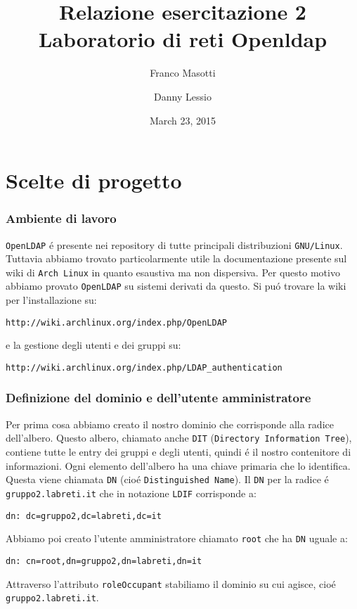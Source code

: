 \documentclass[11pt, a4paper, oneside]{article}
\title{Relazione esercitazione 2 Laboratorio di reti Openldap}
\author{Franco Masotti \and Danny Lessio}
\date{March 23, 2015}
\begin{document}
	\maketitle
	\tableofcontents
	\newpage
	\part{Scelte di progetto}
		\section{Ambiente di lavoro}
			\par
				\texttt{OpenLDAP} \'e presente nei repository 
				di tutte principali distribuzioni 
				\texttt{GNU/Linux}. Tuttavia abbiamo trovato 
				particolarmente utile la documentazione 
				presente sul wiki di \texttt{Arch Linux} in 
				quanto esaustiva ma non dispersiva. Per questo 
				motivo abbiamo provato \texttt{OpenLDAP} su 
				sistemi derivati da questo. Si pu\'o trovare 
				la wiki per l'installazione su:
				\begin{verbatim}
http://wiki.archlinux.org/index.php/OpenLDAP
				\end{verbatim}
				e la gestione degli utenti e dei gruppi su:
				\begin{verbatim}
http://wiki.archlinux.org/index.php/LDAP_authentication
				\end{verbatim}
		\section{Definizione del dominio e dell'utente amministratore}
			\par
				Per prima cosa abbiamo creato il nostro 
				dominio che corrisponde alla radice 
				dell'albero. Questo albero, chiamato anche
				\texttt{DIT} (\texttt{Directory Information 
				Tree}), contiene tutte le entry dei gruppi e
				degli utenti, quindi \'e il nostro contenitore 
				di informazioni.
				Ogni elemento dell'albero ha una chiave
				primaria che lo identifica. Questa viene
				chiamata \texttt{DN} (cio\'e
				\texttt{Distinguished Name}).
				Il \texttt{DN} per 
				la radice \'e \texttt{gruppo2.labreti.it} che
				in notazione \texttt{LDIF} corrisponde a:
				\begin{verbatim}
dn: dc=gruppo2,dc=labreti,dc=it
				\end{verbatim}
			\par
				Abbiamo poi creato l'utente amministratore 
				chiamato \texttt{root} che ha \texttt{DN} 
				uguale a:
				\begin{verbatim}
dn: cn=root,dn=gruppo2,dn=labreti,dn=it
				\end{verbatim}
				Attraverso l'attributo \texttt{roleOccupant}
				stabiliamo il dominio su cui agisce, cio\'e 
				\texttt{gruppo2.labreti.it}.
\end{document}
